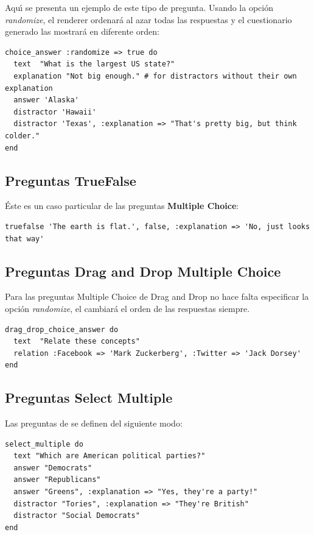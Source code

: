Aqu\'{\i} se presenta un ejemplo de este tipo de pregunta. Usando la opci\'on \textit{randomize}, el renderer ordenar\'a al azar todas las respuestas
y el cuestionario generado las mostrar\'a en diferente orden:
\begin{lstlisting}
choice_answer :randomize => true do
  text  "What is the largest US state?"
  explanation "Not big enough." # for distractors without their own explanation
  answer 'Alaska'
  distractor 'Hawaii'
  distractor 'Texas', :explanation => "That's pretty big, but think colder."
end
\end{lstlisting}

\subsection{Preguntas TrueFalse}
\label{subsec:Apendice2.4}

\'Este es un caso particular de las preguntas {\bfseries Multiple Choice}:
\begin{lstlisting}
truefalse 'The earth is flat.', false, :explanation => 'No, just looks that way'
\end{lstlisting}
\newpage

\subsection{Preguntas Drag and Drop Multiple Choice}
\label{subsec:Apendice2.5}

Para las preguntas Multiple Choice de Drag and Drop no hace falta especificar la opci\'on \textit{randomize}, el  cambiar\'a el orden de las 
respuestas siempre.
\begin{lstlisting}
drag_drop_choice_answer do
  text  "Relate these concepts"
  relation :Facebook => 'Mark Zuckerberg', :Twitter => 'Jack Dorsey'
end
\end{lstlisting}

\subsection{Preguntas Select Multiple}
\label{subsec:Apendice2.6}

Las preguntas de  se definen del siguiente modo:
\begin{lstlisting}
select_multiple do
  text "Which are American political parties?"
  answer "Democrats"
  answer "Republicans"
  answer "Greens", :explanation => "Yes, they're a party!"
  distractor "Tories", :explanation => "They're British"
  distractor "Social Democrats"
end
\end{lstlisting}

